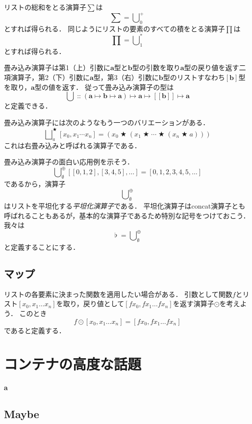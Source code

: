 \documentclass[twocolumn]{jsbook}
\def\[{[\![}
\def\]{]\!]}
\newcommand{\hsklType}[1]{\textbf{#1}}
\DeclareMathOperator{\hsklConcat}{\flat}
\newcommand{\hsklAppend}{\oplus}
\newcommand{\hsklEmptyList}{\emptyset}
\newcommand{\hsklMap}{\odot}
\newcommand{\hsklListType}[1]{\[#1\]}
\DeclareMathOperator{\mathAnyBinaryOperator}{\bigstar}
\DeclareMathOperator{\mathIn}{::}
\DeclareMathOperator*{\mathFold}{\bigcup}
\DeclareMathOperator*{\mathFoldRight}{\bigsqcup}
\DeclareMathOperator{\mathMapsTo}{\mapsto}
\newcommand{\mathMorphII}[3]{#1\mathMapsTo#2\mathMapsTo#3}
\newcommand{\mathMorphIII}[4]{#1\mathMapsTo#2\mathMapsTo#3\mathMapsTo#4}
\newcommand{\keyword}[1]{\emph{#1}}
\newenvironment{leader}{\begingroup\bf}{\endgroup}
\begin{document}
リストの総和をとる演算子$\sum$は$$\sum=\mathFold^+_0$$とすれば得られる．
同じようにリストの要素のすべての積をとる演算子$\prod$は$$\prod=\mathFold^*_1$$とすれば得られる．

畳み込み演算子は第1（上）引数に$\hsklType{a}$型と$\hsklType{b}$型の引数を取り$\hsklType{a}$型の戻り値を返す二項演算子，第2（下）引数に$\hsklType{a}$型，第3（右）引数に$\hsklType{b}$型のリストすなわち$[\hsklType{b}]$型を取り，$\hsklType{a}$型の値を返す．
従って畳み込み演算子の型は$$\mathFold\mathIn\mathMorphIII{(\mathMorphII{\hsklType{a}}{\hsklType{b}}{\hsklType{a}})}{\hsklType{a}}{\hsklListType{\hsklType{b}}}{\hsklType{a}}$$と定義できる．

畳み込み演算子には次のようなもう一つのバリエーションがある．
$$\mathFoldRight^{\mathAnyBinaryOperator}_{a}[x_0,x_1\dotsb x_n]=\left(x_0\mathAnyBinaryOperator\left(x_1\mathAnyBinaryOperator\dotsb\mathAnyBinaryOperator\left(x_n\mathAnyBinaryOperator a\right)\right)\right)$$
これは右畳み込みと呼ばれる演算子である．

畳み込み演算子の面白い応用例を示そう．
$$\mathFold_\hsklEmptyList^\hsklAppend[[0,1,2],[3,4,5],\dots]=[0,1,2,3,4,5,\dots]$$
であるから，演算子$$\mathFold_\hsklEmptyList^\hsklAppend$$はリストを平坦化する\keyword{平坦化演算子}である．
平坦化演算子はconcat演算子とも呼ばれることもあるが，基本的な演算子であるため特別な記号をつけておこう．
我々は$$\hsklConcat=\mathFold_\hsklEmptyList^\hsklAppend$$と定義することにする．

\section{マップ}

リストの各要素に決まった関数を適用したい場合がある．
引数として関数$f$とリスト$[x_0,x_1\dots x_n]$を取り，戻り値として$[fx_0,fx_1\dots fx_n]$を返す演算子$\hsklMap$を考えよう．
このとき$$f\hsklMap[x_0,x_1\dots x_n]=[fx_0,fx_1\dots fx_n]$$であると定義する．



\chapter{コンテナの高度な話題}

\begin{leader}
a
\end{leader}


\section{Maybe}
\end{document}
